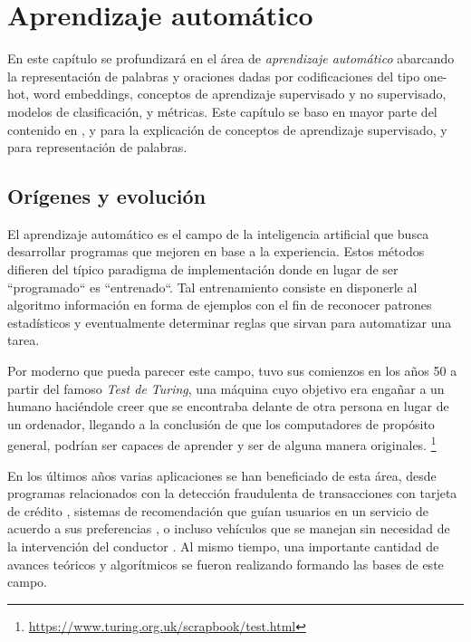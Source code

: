 \chapter{Aprendizaje automático}
\label{ch:lit_ml}

En este capítulo se profundizará en el área de \emph{aprendizaje automático}
abarcando la representación de palabras y oraciones dadas por codificaciones del
tipo one-hot, word embeddings, conceptos de aprendizaje supervisado y no
supervisado, modelos de clasificación, y métricas. Este capítulo se baso en mayor parte del contenido en \citep{Bishop-2006}, y \citep{Tianqi-2016} para la explicación de conceptos de aprendizaje supervisado, y  \citep{Bojanowski-Grave-Joulin-Mikolov-2016, bojanowski-2017, Mikolov-2013} para representación de palabras.

\section{Orígenes y evolución}

El aprendizaje automático es el campo de la inteligencia artificial que busca
desarrollar programas que mejoren en base a la experiencia. Estos métodos
difieren del típico paradigma de implementación donde en lugar de ser
``programado`` es ``entrenado``. Tal entrenamiento consiste en disponerle al
algoritmo información en forma de ejemplos con el fin de reconocer patrones
estadísticos y eventualmente determinar reglas que sirvan para automatizar una
tarea.

Por moderno que pueda parecer este campo, tuvo sus comienzos en los años 50 a
partir del famoso \emph{Test de Turing}, una máquina cuyo objetivo era engañar a
un humano haciéndole creer que se encontraba delante de otra persona en lugar de
un ordenador, llegando  a la conclusión de que los computadores de propósito
general, podrían ser capaces de aprender y ser de alguna manera originales.
\footnote{\url{https://www.turing.org.uk/scrapbook/test.html}}

En los últimos años varias aplicaciones se han beneficiado de esta área, desde
programas relacionados con la detección fraudulenta de transacciones con tarjeta
de crédito \citep{Fang-2021}, sistemas de recomendación que guían usuarios en un servicio de
acuerdo a sus preferencias \citep{Burke-2007}, o incluso vehículos que se manejan sin necesidad de
la intervención del conductor \citep{Sorin-2019}. Al mismo tiempo, una importante cantidad de
avances teóricos y algorítmicos se fueron realizando formando las bases de este
campo.

